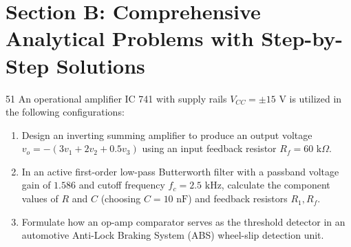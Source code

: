 \newpage
\section{Section B: Comprehensive Analytical Problems with Step-by-Step Solutions}

\begin{subjectiveq}{5}{1}
An operational amplifier IC 741 with supply rails $V_{CC} = \pm 15\text{ V}$ is utilized in the following configurations:\begin{enumerate}[label=(\alph*)]\item Design an inverting summing amplifier to produce an output voltage $v_o = -(3v_1 + 2v_2 + 0.5v_3)$ using an input feedback resistor $R_f = 60\text{ k}\Omega$.\item In an active first-order low-pass Butterworth filter with a passband voltage gain of $1.586$ and cutoff frequency $f_c = 2.5\text{ kHz}$, calculate the component values of $R$ and $C$ (choosing $C = 10\text{ nF}$) and feedback resistors $R_1, R_f$.\item Formulate how an op-amp comparator serves as the threshold detector in an automotive Anti-Lock Braking System (ABS) wheel-slip detection unit.\end{enumerate}
\end{subjectiveq}

